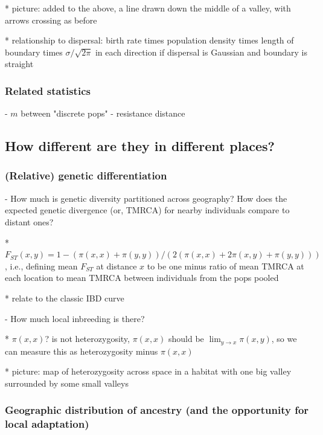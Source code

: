 \documentclass{ar-1col}
\begin{document}
            * picture: added to the above, a line drawn down the middle of a valley, with arrows crossing as before

            * relationship to dispersal: birth rate times population density times length of boundary times $\sigma/\sqrt{2\pi}$ in each direction
                if dispersal is Gaussian and boundary is straight

\subsubsection{Related statistics}

        - $m$ between "discrete pops"
        - resistance distance


\subsection{How different are they in different places?}

\subsubsection{(Relative) genetic differentiation}

        - How much is genetic diversity partitioned across geography?
            How does the expected genetic divergence (or, TMRCA) for nearby individuals compare to distant ones?
           
            * $F_{ST}(x,y) = 1 - (\pi(x,x) + \pi(y,y))/(2 (\pi(x,x) + 2 \pi(x,y) + \pi(y,y)))$,
                i.e., defining mean $F_{ST}$ at distance $x$ to be one minus ratio of mean TMRCA at each location
                to mean TMRCA between individuals from the pops pooled

            * relate to the classic IBD curve

        - How much local inbreeding is there?

            * $\pi(x,x)$? is not heterozygosity, $\pi(x,x)$ should be $\lim_{y \to x} \pi(x,y)$,
                so we can measure this as heterozygosity minus $\pi(x,x)$

            * picture: map of heterozygosity across space in a habitat with one big valley surrounded by some small valleys


\subsubsection{Geographic distribution of ancestry (and the opportunity for local adaptation)}
\end{document}
